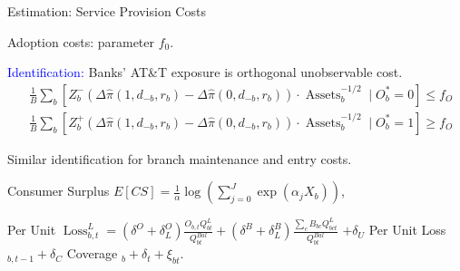 \documentclass[notes,10pt, aspectratio=169]{beamer}
\newenvironment{wideitemize}{\itemize\addtolength{\itemsep}{10pt}}{\enditemize}
\begin{document}
\begin{frame}{Estimation: Service Provision Costs}

    \begin{wideitemize}

        \item Adoption costs: parameter $f_0$.
        \item \textcolor{blue}{Identification:} Banks' AT\&T exposure is orthogonal unobservable cost.
         $$\begin{aligned} & \frac{1}{B} \sum_b\left[Z_b^{-}\left(\Delta \hat{\pi}\left(1, d_{-b}, r_b\right)-\Delta \hat{\pi}\left(0, d_{-b}, r_b\right)\right) \cdot \operatorname{Assets}_b^{-1 / 2} \mid O_b^*=0\right] \leq f_O \\ & \frac{1}{B} \sum_b\left[Z_b^{+}\left(\Delta \hat{\pi}\left(1, d_{-b}, r_b\right)-\Delta \hat{\pi}\left(0, d_{-b}, r_b\right)\right) \cdot \operatorname{Assets}_b^{-1 / 2} \mid O_b^*=1\right] \geq f_O\end{aligned}$$
  
        \item Similar identification for branch maintenance and entry costs.
        \item Consumer Surplus 
 $E[C S]=\frac{1}{\alpha} \log \left(\sum_{j=0}^J \exp \left(\alpha_j X_b\right)\right)$,

 \item Per Unit $\operatorname{Loss}_{b, t}^L=\left(\delta^O+\delta_L^O\right) \frac{O_{b, t} Q_{b t}^L}{Q_{b t}^{B a l}}+\left(\delta^B+\delta_L^B\right) \frac{\sum_c B_{b c} Q_{b c t}^L}{Q_{b t}^{B a l}}$
 $+\delta_U$ Per Unit Loss $_{b, t-1}+\delta_C$ Coverage $_b+\delta_t+\xi_{b t}$.
    \end{wideitemize}

\end{frame}

   

\end{document}

